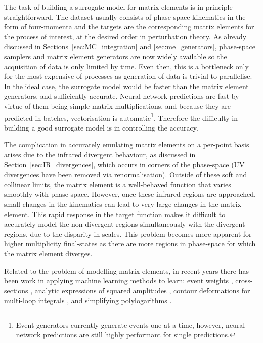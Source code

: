 \documentclass[main.tex]{subfiles}
\begin{document}
    The task of building a surrogate
    model for matrix elements is in principle straightforward.
    The dataset usually consists of phase-space kinematics
    in the form of four-momenta and the targets are the
    corresponding matrix elements for the process of interest,
    at the desired order in perturbation theory. As already
    discussed in Sections~\ref{sec:MC_integration} and \ref{sec:me_generators},
    phase-space samplers and matrix element generators are
    now widely available so the acquisition of data is only
    limited by time. Even then, this is a bottleneck only
    for the most expensive of processes as generation
    of data is trivial to parallelise. In the ideal case, the
    surrogate model would be faster than the matrix
    element generators, and sufficiently accurate. Neural
    network predictions are fast by virtue of them being
    simple matrix multiplications, and because they are predicted
    in batches, vectorisation is automatic\footnote{Event generators currently generate events one at a time, however, neural network predictions are still highly performant for single predictions.}.
    Therefore the difficulty
    in building a good surrogate model is in controlling
    the accuracy.

    The complication in accurately emulating matrix elements
    on a per-point basis arises due to the infrared divergent behaviour,
    as discussed in Section~\ref{sec:IR_divergences}, which occurs
    in corners of the phase-space
    (UV divergences have been removed via renormalisation).
    Outside of these soft and collinear limits, the matrix element
    is a well-behaved function that varies smoothly with phase-space.
    However, once these infrared regions are approached, small changes in the
    kinematics can lead to very large changes in the matrix
    element. This rapid response in the target
    function makes it difficult to accurately model the
    non-divergent regions simultaneously with the divergent
    regions, due to the disparity in scales. This problem
    becomes more apparent for higher multiplicity final-states
    as there are more regions in phase-space for which
    the matrix element diverges.

    Related to the problem of modelling matrix elements, in recent
    years there has been work in applying machine learning
    methods to learn: event weights \cite{Danziger:2021eeg},
    cross-sections \cite{Otten:2018kum,Buckley:2020bxg},
    analytic expressions of squared amplitudes \cite{Alnuqaydan:2022ncd},
    contour deformations for multi-loop integrals \cite{Winterhalder:2021ngy},
    and simplifying polylogarithms \cite{Dersy:2022bym}.
\end{document}
